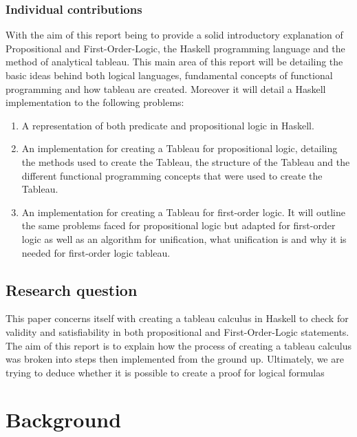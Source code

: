 \documentclass{article}%
\begin{document}
\subsubsection{Individual contributions}
With the aim of this report being to provide a solid introductory explanation of Propositional and First-Order-Logic, the Haskell programming language and the method of analytical tableau. This main  area of this report will be detailing the basic ideas behind both logical languages, fundamental concepts of functional programming and how tableau are created. Moreover it will detail a Haskell implementation to the following problems: 
\begin{enumerate}
\item A representation of both predicate and propositional logic in Haskell.
\item An implementation for creating a Tableau for propositional logic, detailing the methods used to create the Tableau, the structure of the Tableau and the different functional programming concepts that were used to create the Tableau.
\item An implementation for creating a Tableau for first-order logic. It will outline the same problems faced for propositional logic but adapted for first-order logic as well as an algorithm for unification, what unification is and why it is needed for first-order logic tableau. 
\end{enumerate}


\subsection{Research question}
This paper concerns itself with creating a tableau calculus in Haskell to check for validity and satisfiability in both propositional and First-Order-Logic statements. The aim of this report is to explain how the process of creating a tableau calculus was broken into steps then implemented from the ground up. Ultimately, we are trying to deduce whether it is possible to create a proof for logical formulas

\section{Background}
\end{document}
